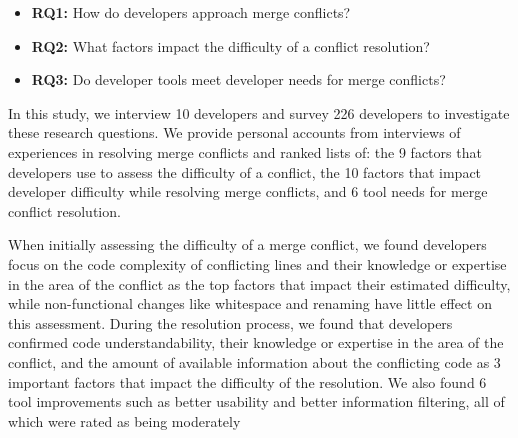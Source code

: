 \begin{itemize}
\item\textbf{RQ1:} How do developers approach merge conflicts?\\
\item\textbf{RQ2:} What factors impact the difficulty of a conflict resolution?\\
\item\textbf{RQ3:} Do developer tools meet developer needs for merge conflicts?\\
\end{itemize}

In this study, we interview 10 developers and survey 226 developers to investigate these research questions. We provide personal accounts from interviews of experiences in resolving merge conflicts and ranked lists of: the 9 factors that developers use to assess the difficulty of a conflict, the 10 factors that impact developer difficulty while resolving merge conflicts, and 6 tool needs for merge conflict resolution.

When initially assessing the difficulty of a merge conflict, we found developers focus on the code complexity of conflicting lines and their knowledge or expertise in the area of the conflict as the top factors that impact their estimated difficulty, while non-functional changes like whitespace and renaming have little effect on this assessment. 
During the resolution process, we found that developers confirmed code understandability, their knowledge or expertise in the area of the conflict, and the amount of available information about the conflicting code as 3 important factors that impact the difficulty of the resolution.
We also found 6 tool improvements such as better usability and better information filtering, all of which were rated as being moderately 
